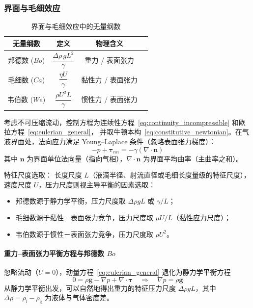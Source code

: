 \subsubsection{界面与毛细效应}
\begin{table}[h]
\centering
\caption{界面与毛细效应中的无量纲数}
\renewcommand{\arraystretch}{1.5}
\begin{tabular}{|c|c|c|c|}
\hline
\textbf{无量纲数} & \textbf{定义} & \textbf{物理含义} \\
\hline
邦德数 ($Bo$) & $\dfrac{\Delta\rho \, g L^2}{\gamma}$ & 重力 / 表面张力\\
\hline
毛细数 ($Ca$) & $\dfrac{\eta U}{\gamma}$ & 黏性力 / 表面张力 \\
\hline
韦伯数 ($We$) & $\dfrac{\rho U^2 L}{\gamma}$ & 惯性力 / 表面张力 \\
\hline
\end{tabular}
\end{table}

考虑不可压缩流动，控制方程为连续性方程~\eqref{eq:continuity_incompressible} 和欧拉方程~\eqref{eq:eulerian_general}，
并取牛顿本构~\eqref{eq:constitutive_newtonian}。在气液界面处，法向应力满足 Young--Laplace 条件（忽略表面张力梯度）：
\begin{equation}
    -p + \boldsymbol{\tau}_{nn} = -\gamma (\nabla \cdot \mathbf{n})
    \label{eq:young_laplace}
\end{equation}
其中 $\mathbf{n}$ 为界面单位法向量（指向气相），$\nabla \cdot \mathbf{n}$ 为界面平均曲率（主曲率之和）。

特征尺度选取：
长度尺度 $L$（液滴半径、射流直径或毛细长度量级的特征尺度），速度尺度 $U$，压力尺度则视主导平衡的因素选取：
\begin{itemize}
    \item 邦德数源于静力学平衡，压力尺度取 $\Delta\rho g L$ 或 $\gamma/L$；
    \item 毛细数源于黏性－表面张力竞争，压力尺度取 $\mu U/L$（黏性应力尺度）；
    \item 韦伯数源于惯性－表面张力竞争，压力尺度取 $\rho U^2$。
\end{itemize}

\paragraph{重力--表面张力平衡方程与邦德数 $Bo$}

忽略流动（$U=0$），动量方程~\eqref{eq:eulerian_general} 退化为静力学平衡方程
\[
0 = \rho \mathbf{g} - \nabla p + \nabla \cdot \boldsymbol{\tau} 
\quad\Rightarrow\quad 
\nabla p = \rho \mathbf{g}
\]
从静力学平衡出发，可以自然地得出重力的特征压力尺度 $\Delta\rho g L$，其中 $\Delta\rho = \rho_{\text{l}} - \rho_{\text{g}}$ 为液体与气体密度差。

